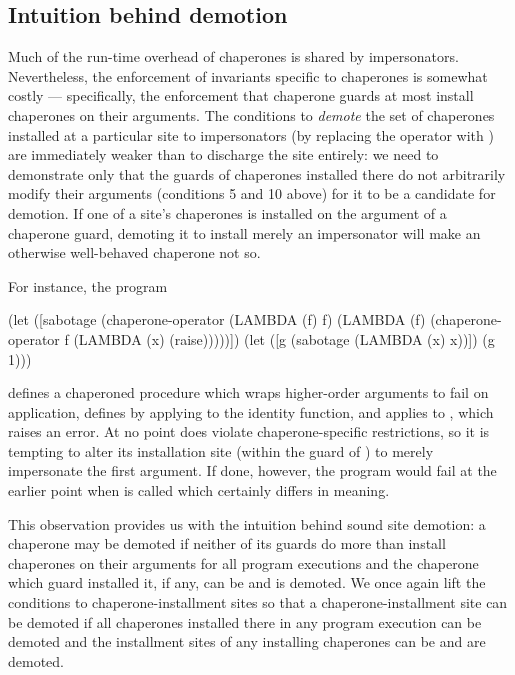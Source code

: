 \documentclass{sigplanconf}
\begin{document}
\subsection{Intuition behind demotion}

Much of the run-time overhead of chaperones is shared by impersonators.
Nevertheless, the enforcement of invariants specific to chaperones is somewhat costly --- specifically, the enforcement that chaperone guards at most install chaperones on their arguments.
The conditions to \emph{demote} the set of chaperones installed at a particular site to impersonators (by replacing the  operator with ) are immediately weaker than to discharge the site entirely: we need to demonstrate only that the guards of chaperones installed there do not arbitrarily modify their arguments (conditions 5 and 10 above) for it to be a candidate for demotion.
If one of a site's chaperones is installed on the argument of a chaperone guard, demoting it to install merely an impersonator will make an otherwise well-behaved chaperone not so.

For instance, the program
\begin{schemedisplay}
(let ([sabotage (chaperone-operator
                 (LAMBDA (f) f)
                 (LAMBDA (f) (chaperone-operator f (LAMBDA (x) (raise)))))])
  (let ([g (sabotage (LAMBDA (x) x))])
    (g 1)))
\end{schemedisplay}
defines a chaperoned procedure  which wraps higher-order arguments to fail on application, defines  by applying  to the identity function, and applies  to , which raises an error.
At no point does  violate chaperone-specific restrictions, so it is tempting to alter its installation site (within the guard of ) to merely impersonate the first argument.
If done, however, the program would fail at the earlier point when  is called which certainly differs in meaning.

This observation provides us with the intuition behind sound site demotion: a chaperone may be demoted if neither of its guards do more than install chaperones on their arguments for all program executions and the chaperone which guard installed it, if any, can be and is demoted. 
We once again lift the conditions to chaperone-installment sites so that a chaperone-installment site can be demoted if all chaperones installed there in any program execution can be demoted and the installment sites of any installing chaperones can be and are demoted.
\end{document}
